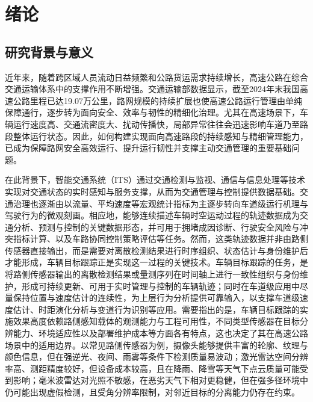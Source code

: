 \documentclass{xdupgthesis}
\begin{document}
\chapter{绪论}

\section{研究背景与意义}

近年来，随着跨区域人员流动日益频繁和公路货运需求持续增长，高速公路在综合交通运输体系中的支撑作用不断增强。交通运输部数据显示，截至2024年末我国高速公路里程已达19.07万公里\cite{mot2024statisticalbulletin}，路网规模的持续扩展也使高速公路运行管理由单纯保障通行，逐步转为面向安全、效率与韧性的精细化治理。尤其在高速场景下，车辆运行速度高、交通流密度大、扰动传播快，局部异常往往会迅速影响车道乃至路段整体运行状态。因此，如何构建实现面向高速路段的持续感知与精细管理能力，已成为保障路网安全高效运行、提升运行韧性并支撑主动交通管理的重要基础问题。

在此背景下，智能交通系统（ITS）通过交通检测与监视、通信与信息处理等技术实现对交通状态的实时感知与服务支撑，从而为交通管理与控制提供数据基础\cite{mimbela2007vdstits}。交通治理也逐渐由以流量、平均速度等宏观统计指标为主逐步转向车道级运行机理与驾驶行为的微观刻画。相应地，能够连续描述车辆时空运动过程的轨迹数据成为交通分析、预测与控制的关键数据形态\cite{liu2025trajectorysurvey}，并可用于拥堵成因诊断、行驶安全风险与冲突指标计算、以及车路协同控制策略评估等任务。然而，这类轨迹数据并非由路侧传感器直接输出，而是需要对离散检测结果进行时序组织、状态估计与身份维护后才能形成，车辆目标跟踪正是实现这一过程的关键技术。车辆目标跟踪的任务，是将路侧传感器输出的离散检测结果或量测序列在时间轴上进行一致性组织与身份维护，形成可持续更新、可用于实时管理与控制的车辆轨迹；同时在车道级应用中尽量保持位置与速度估计的连续性，为上层行为分析提供可靠输入，以支撑车道级速度估计、时距演化分析与变道行为识别等应用。需要指出的是，车辆目标跟踪的实施效果高度依赖路侧感知载体的观测能力与工程可用性，不同类型传感器在目标分辨能力、环境适应性以及部署维护成本等方面各有特点，这也决定了其在高速公路场景中的适用边界。以常见路侧传感器为例，摄像头能够提供丰富的轮廓、纹理与颜色信息，但在强逆光、夜间、雨雾等条件下检测质量易波动\cite{Pandharipande2023Perception}；激光雷达空间分辨率高、测距精度较好，但设备成本较高，且在降雨、降雪等天气下点云质量可能受到影响\cite{Pandharipande2023Perception,Wu2025LiDARAdverseWeather}；毫米波雷达对光照不敏感，在恶劣天气下相对更稳健，但在强多径环境中仍可能出现虚假检测，且受角分辨率限制，对邻近目标的分离能力仍存在约束\cite{Kong2025mmWaveSurvey}。 
\end{document}
